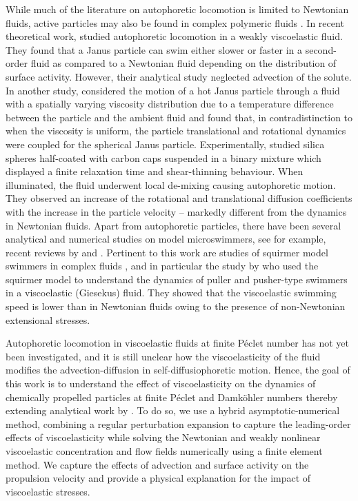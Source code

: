 \documentclass[aps,pre,reprint,twocolumn,notitlepage,superscriptaddress]{revtex4-1}
\begin{document}
While much of the literature on autophoretic locomotion is limited to Newtonian fluids, active particles may also be found in complex polymeric fluids \citep{arratia_review}. In recent theoretical work, \citet{datt2017active} studied autophoretic locomotion in a weakly viscoelastic fluid. They found that a Janus particle can swim either slower or faster in a second-order fluid as compared to a Newtonian fluid depending on the distribution of surface activity. However, their analytical study neglected advection of the solute.  In another study, \citet{PRFStone} considered the motion of a hot Janus particle through a fluid with a spatially varying viscosity distribution due to a temperature difference between the particle and the ambient fluid and found that, in contradistinction to when the viscosity is uniform, the particle translational and rotational dynamics were coupled for the spherical Janus particle. Experimentally, \citet{gomez2016dynamics} studied silica spheres half-coated with carbon caps suspended in a binary mixture which displayed a finite relaxation time and shear-thinning behaviour. When illuminated, the fluid underwent local de-mixing causing autophoretic motion. They observed an increase of the rotational and translational diffusion coefficients with the increase in the particle velocity -- markedly different from the dynamics in Newtonian fluids. Apart from autophoretic particles, there have been several analytical and numerical studies on model microswimmers, see for example, recent reviews by \citet{elfring14} and \citet{sznitman2015}. Pertinent to this work are studies of squirmer model swimmers in complex fluids \citep{zhu2012self, montenegro, Li2014, decorato15, jfmCharu}, and in particular the study by  \citet{zhu2012self} who used the squirmer model\citep{Lighthill1951, Pedley_review} to understand the dynamics of puller and pusher-type swimmers in a viscoelastic (Giesekus) fluid. They showed that the viscoelastic swimming speed is lower than in Newtonian fluids owing to the presence of non-Newtonian extensional stresses. 

Autophoretic locomotion in viscoelastic fluids at finite P\'eclet number has not yet been investigated, and it is still unclear how the viscoelasticity of the fluid modifies the advection-diffusion in self-diffusiophoretic motion. Hence, the goal of this work is to understand the effect of viscoelasticity on the dynamics of chemically propelled particles at finite P\'eclet and Damk\"ohler numbers thereby extending analytical work by \citet{datt2017active}. To do so, we use a hybrid asymptotic-numerical method, combining a regular perturbation expansion to capture the leading-order effects of viscoelasticity while solving the Newtonian and weakly nonlinear viscoelastic concentration and flow fields numerically using a finite element method. We capture the effects of advection and surface activity on the propulsion velocity and provide a physical explanation for the impact of viscoelastic stresses.
  
\end{document}
